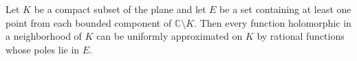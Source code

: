 
Let $K$ be a compact subset of the plane and let $E$ be a set containing at least one point from each bounded component of $\mathbb{C}\setminus K$. Then every function holomorphic in a neighborhood of $K$ can be uniformly approximated on $K$ by rational functions whose poles lie in $E$.
